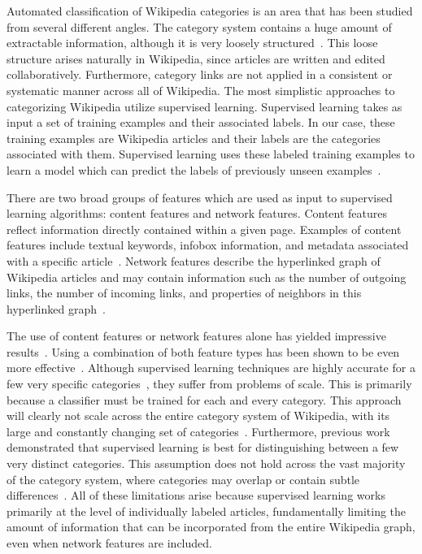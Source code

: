 \documentclass{sig-alternate}
\begin{document}
Automated classification of Wikipedia categories is an area that has been studied from several different angles. The category system contains a huge amount of extractable information, although it is very loosely structured~\cite{Ponzetto,Strube}. This loose structure arises naturally in Wikipedia, since articles are written and edited collaboratively. Furthermore, category links are not applied in a consistent or systematic manner across all of Wikipedia. The most simplistic approaches to categorizing Wikipedia utilize supervised learning. Supervised learning takes as input a set of training examples and their associated labels. In our case, these training examples are Wikipedia articles and their labels are the categories associated with them. Supervised learning uses these labeled training examples to learn a model which can predict the labels of previously unseen examples~\cite{Szymanski}.

There are two broad groups of features which are used as input to supervised learning algorithms: content features and network features. Content features reflect information directly contained within a given page. Examples of content features include textual keywords, infobox information, and metadata associated with a specific article~\cite{Tkachenko}. Network features describe the hyperlinked graph of Wikipedia articles and may contain information such as the number of outgoing links, the number of incoming links, and properties of neighbors in this hyperlinked graph~\cite{Getoor}.

The use of content features or network features alone has yielded impressive results~\cite{Gantner, Szymanski}. Using a combination of both feature types has been shown to be even more effective~\cite{Gantner}. Although supervised learning techniques are highly accurate for a few very specific categories~\cite{Gantner, Fu, Szymanski, Tkachenko}, they suffer from problems of scale. This is primarily because a classifier must be trained for each and every category. This approach will clearly not scale across the entire category system of Wikipedia, with its large and constantly changing set of categories~\cite{Fu}. Furthermore, previous work demonstrated that supervised learning is best for distinguishing between a few very distinct categories. This assumption does not hold across the vast majority of the category system, where categories may overlap or contain subtle differences~\cite{Thornton}. All of these limitations arise because supervised learning works primarily at the level of individually labeled articles, fundamentally limiting the amount of information that can be incorporated from the entire Wikipedia graph, even when network features are included.
\end{document}
